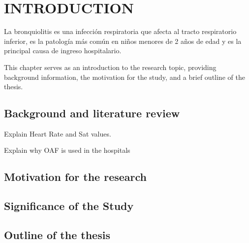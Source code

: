 \section{INTRODUCTION} \label{sec:itroduction}

La bronquiolitis es una infección respiratoria que afecta al tracto respiratorio inferior, es la patología más común en niños menores de 2 años de edad y es la principal causa de ingreso hospitalario.   

This chapter serves as an introduction to the research topic, providing background information, the motivation for the study, and a brief outline of the thesis.
\subsection{Background and literature review}

Explain Heart Rate and Sat values. 

Explain why OAF is used in the hospitals


\subsection{Motivation for the research}

\subsection{Significance of the Study}


\subsection{Outline of the thesis}


